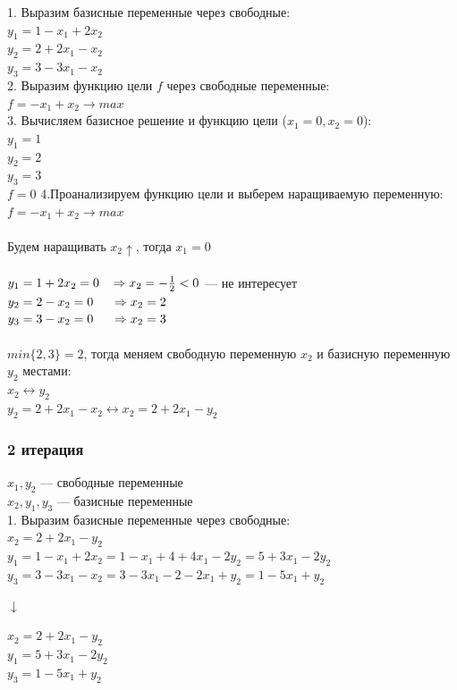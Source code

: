 \documentclass[14pt,a4paper,fleqn]{extarticle}
\begin{document}
1. Выразим базисные переменные через свободные:\\
$y_1 = 1 - x_1 + 2x_2$\\
$y_2 = 2 + 2x_1 - x_2$\\
$y_3 = 3 - 3x_1 - x_2$\\

2. Выразим функцию цели $f$ через свободные переменные:\\
$f = -x_1 + x_2 \longrightarrow max$\\

3. Вычисляем базисное решение и функцию цели ($x_1 = 0, x_2 = 0$):\\
$y_1 = 1$\\
$y_2 = 2$\\
$y_3 = 3$\\
$f = 0$
\newpage
4.Проанализируем функцию цели и выберем наращиваемую переменную:\\
$f = -x_1 + x_2 \longrightarrow max$\\\\
Будем наращивать $x_2 \uparrow$, тогда $x_1 = 0$\\\\
$y_1 = 1 + 2x_2 = 0 \hspace{0.3cm} \Rightarrow x_2 = -\frac{1}{2} < 0$ --- не интересует\\
$y_2 = 2 - x_2 = 0 \hspace{0.5cm} \Rightarrow x_2 = 2$\\
$y_3 = 3 - x_2 = 0 \hspace{0.5cm} \Rightarrow x_2 = 3$\\\\
$min\{2, 3\} = 2$, тогда меняем свободную переменную $x_2$ и базисную переменную $y_2$ местами:\\
$x_2 \leftrightarrow y_2$\\
$y_2 = 2 + 2x_1 - x_2 \leftrightarrow x_2 = 2 + 2x_1 - y_2$

\subsubsection*{2 итерация}
$x_1, y_2$ --- свободные переменные\\
$x_2, y_1, y_3$ --- базисные переменные\\

1. Выразим базисные переменные через свободные:\\
$x_2 = 2 + 2x_1 - y_2$\\
$y_1 = 1 - x_1 + 2x_2 = 1 - x_1 + 4 + 4x_1 - 2y_2 = 5 + 3x_1 - 2y_2$\\
$y_3 = 3 - 3x_1 - x_2 = 3 - 3x_1 - 2 - 2x_1 + y_2 = 1 - 5x_1 + y_2$
\begin{center}$\downarrow$\end{center}
$x_2 = 2 + 2x_1 - y_2$\\
$y_1 = 5 + 3x_1 - 2y_2$\\
$y_3 = 1 - 5x_1 + y_2$\\
\newpage
\end{document}
